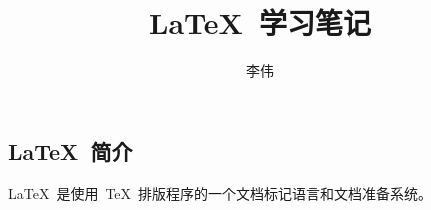 \documentclass{article}
\begin{document}
\begin{CJK*}{UTF8}{hybrid}

\title{\LaTeX\ 学习笔记}
\author{李伟}

\maketitle

\section*{\LaTeX\ 简介}
\LaTeX\ 是使用~\TeX\ 排版程序的一个文档标记语言和文档准备系统。

\newpage
\end{CJK*}
\end{document}
